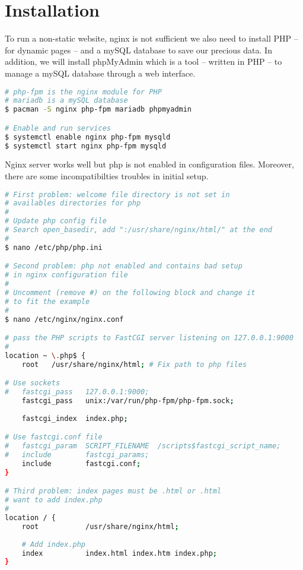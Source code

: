 \section{Installation}
To run a non-static website, nginx is not sufficient we also need to install PHP 
-- for dynamic pages -- and a mySQL database to save our precious data. In 
addition, we will install phpMyAdmin which is a tool -- written in PHP -- to 
manage a mySQL database through a web interface. 

\begin{lstlisting}[language=bash,caption=Install a full web server]
# php-fpm is the nginx module for PHP
# mariadb is a mySQL database
$ pacman -S nginx php-fpm mariadb phpmyadmin

# Enable and run services
$ systemctl enable nginx php-fpm mysqld
$ systemctl start nginx php-fpm mysqld
\end{lstlisting} 

Nginx server works well but php is not enabled in configuration files. Moreover, 
there are some incompatibilties troubles in initial setup.

\begin{lstlisting}[language=bash,caption=Enable php in nginx]
# First problem: welcome file directory is not set in
# availables directories for php
#
# Update php config file
# Search open_basedir, add ":/usr/share/nginx/html/" at the end
#
$ nano /etc/php/php.ini

# Second problem: php not enabled and contains bad setup
# in nginx configuration file
#
# Uncomment (remove #) on the following block and change it 
# to fit the example
#
$ nano /etc/nginx/nginx.conf

# pass the PHP scripts to FastCGI server listening on 127.0.0.1:9000
#
location ~ \.php$ {
    root   /usr/share/nginx/html; # Fix path to php files

# Use sockets   
#   fastcgi_pass   127.0.0.1:9000; 
    fastcgi_pass   unix:/var/run/php-fpm/php-fpm.sock;
            
    fastcgi_index  index.php;

# Use fastcgi.conf file
#   fastcgi_param  SCRIPT_FILENAME  /scripts$fastcgi_script_name;
#   include        fastcgi_params;
    include        fastcgi.conf;
}

# Third problem: index pages must be .html or .html
# want to add index.php
#
location / {
    root           /usr/share/nginx/html;
	
	# Add index.php
    index          index.html index.htm index.php;
}
\end{lstlisting}

